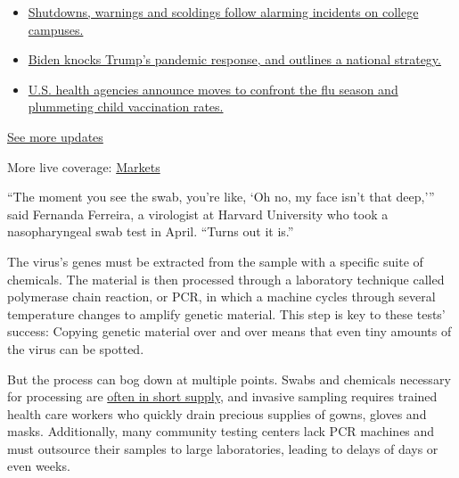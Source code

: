 \begin{itemize}
\tightlist
\item
  \href{https://www.nytimes3xbfgragh.onion/2020/08/20/world/coronavirus-covid.html?action=click\&pgtype=Article\&state=default\&region=MAIN_CONTENT_1\&context=storylines_live_updates\#link-68774d88}{Shutdowns,
  warnings and scoldings follow alarming incidents on college campuses.}
\item
  \href{https://www.nytimes3xbfgragh.onion/2020/08/20/world/coronavirus-covid.html?action=click\&pgtype=Article\&state=default\&region=MAIN_CONTENT_1\&context=storylines_live_updates\#link-26b58724}{Biden
  knocks Trump's pandemic response, and outlines a national strategy.}
\item
  \href{https://www.nytimes3xbfgragh.onion/2020/08/20/world/coronavirus-covid.html?action=click\&pgtype=Article\&state=default\&region=MAIN_CONTENT_1\&context=storylines_live_updates\#link-4e542da3}{U.S.
  health agencies announce moves to confront the flu season and
  plummeting child vaccination rates.}
\end{itemize}

\href{https://www.nytimes3xbfgragh.onion/2020/08/20/world/coronavirus-covid.html?action=click\&pgtype=Article\&state=default\&region=MAIN_CONTENT_1\&context=storylines_live_updates}{See
more updates}

More live coverage:
\href{https://www.nytimes3xbfgragh.onion/live/2020/08/20/business/stock-market-today-coronavirus?action=click\&pgtype=Article\&state=default\&region=MAIN_CONTENT_1\&context=storylines_live_updates}{Markets}

``The moment you see the swab, you're like, `Oh no, my face isn't that
deep,''' said Fernanda Ferreira, a virologist at Harvard University who
took a nasopharyngeal swab test in April. ``Turns out it is.''

The virus's genes must be extracted from the sample with a specific
suite of chemicals. The material is then processed through a laboratory
technique called polymerase chain reaction, or PCR, in which a machine
cycles through several temperature changes to amplify genetic material.
This step is key to these tests' success: Copying genetic material over
and over means that even tiny amounts of the virus can be spotted.

But the process can bog down at multiple points. Swabs and chemicals
necessary for processing are
\href{https://www.nytimes3xbfgragh.onion/2020/03/18/health/coronavirus-test-shortages-face-masks-swabs.html}{often
in short supply}, and invasive sampling requires trained health care
workers who quickly drain precious supplies of gowns, gloves and masks.
Additionally, many community testing centers lack PCR machines and must
outsource their samples to large laboratories, leading to delays of days
or even weeks.

